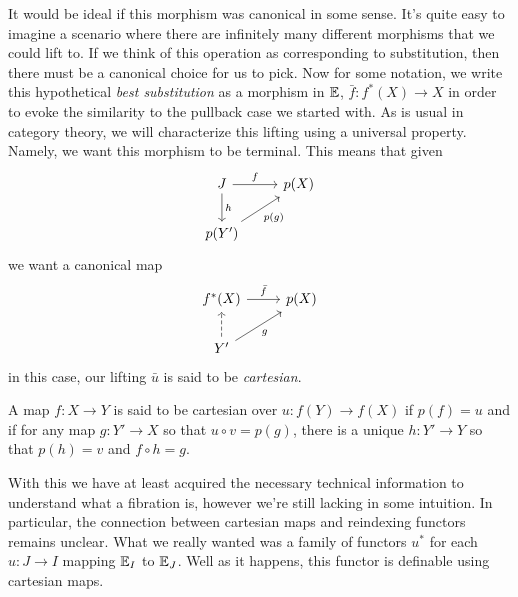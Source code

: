 It would be ideal if this morphism was canonical in some sense. It's
quite easy to imagine a scenario where there are infinitely many
different morphisms that we could lift to. If we think of this
operation as corresponding to substitution, then there must be a
canonical choice for us to pick. Now for some notation, we write this
hypothetical \emph{best substitution} as a morphism in $\mathbb{E}$,
$\bar{f} : f^*(X) \to X$ in order to evoke the similarity to the
pullback case we started with. As is usual in category theory, we will
characterize this lifting using a universal property. Namely, we want
this morphism to be terminal. This means that given
\[
  \begin{tikzcd}
    J \ar[r, "f"] \ar[d, "h"] & p(X)\\
    p(Y') \ar[ru, "p(g)", swap]
  \end{tikzcd}
\]
we want a canonical map
\[
  \begin{tikzcd}
    f^*(X) \ar[r, "\bar{f}"] & p(X)\\
    Y' \ar[u, dashed] \ar[ru, "g", swap]
  \end{tikzcd}
\]
in this case, our lifting $\bar{u}$ is said to be \emph{cartesian}.
\begin{defn}\label{defn:fibrations:cartesian}
  A map $f : X \to Y$ is said to be cartesian over $u : f(Y) \to f(X)$
  if $p(f) = u$ and if for any map $g : Y' \to X$ so that
  $u \circ v = p(g)$, there is a unique $h : Y' \to Y$ so that
  $p(h) = v$ and $f \circ h = g$.
\end{defn}

With this we have at least acquired the necessary technical
information to understand what a fibration is, however we're still
lacking in some intuition. In particular, the connection between
cartesian maps and reindexing functors remains unclear. What we really
wanted was a family of functors $u^*$ for each $u : J \to I$ mapping
$\mathbb{E}_I$ to $\mathbb{E}_J$. Well as it happens, this functor is definable
using cartesian maps.

